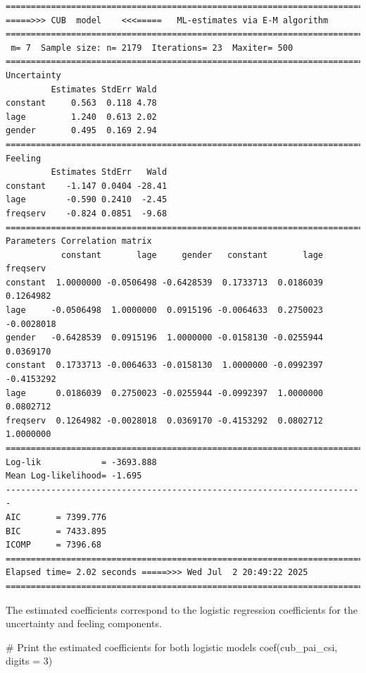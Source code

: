 \documentclass[
  letterpaper,
  DIV=11,
  numbers=noendperiod]{scrartcl}
\newenvironment{Shaded}{\begin{snugshade}}{\end{snugshade}}
\newcommand{\AttributeTok}[1]{\textcolor[rgb]{0.40,0.45,0.13}{#1}}
\newcommand{\CommentTok}[1]{\textcolor[rgb]{0.37,0.37,0.37}{#1}}
\newcommand{\DecValTok}[1]{\textcolor[rgb]{0.68,0.00,0.00}{#1}}
\newcommand{\FunctionTok}[1]{\textcolor[rgb]{0.28,0.35,0.67}{#1}}
\newcommand{\NormalTok}[1]{\textcolor[rgb]{0.00,0.23,0.31}{#1}}
\begin{document}
\begin{verbatim}
======================================================================= 
=====>>> CUB  model    <<<=====   ML-estimates via E-M algorithm   
======================================================================= 
 m= 7  Sample size: n= 2179  Iterations= 23  Maxiter= 500 
======================================================================= 
Uncertainty                                            
         Estimates StdErr Wald
constant     0.563  0.118 4.78
lage         1.240  0.613 2.02
gender       0.495  0.169 2.94
======================================================================= 
Feeling                                            
         Estimates StdErr   Wald
constant    -1.147 0.0404 -28.41
lage        -0.590 0.2410  -2.45
freqserv    -0.824 0.0851  -9.68
======================================================================= 
Parameters Correlation matrix 
           constant       lage     gender   constant       lage   freqserv
constant  1.0000000 -0.0506498 -0.6428539  0.1733713  0.0186039  0.1264982
lage     -0.0506498  1.0000000  0.0915196 -0.0064633  0.2750023 -0.0028018
gender   -0.6428539  0.0915196  1.0000000 -0.0158130 -0.0255944  0.0369170
constant  0.1733713 -0.0064633 -0.0158130  1.0000000 -0.0992397 -0.4153292
lage      0.0186039  0.2750023 -0.0255944 -0.0992397  1.0000000  0.0802712
freqserv  0.1264982 -0.0028018  0.0369170 -0.4153292  0.0802712  1.0000000
======================================================================= 
Log-lik            = -3693.888 
Mean Log-likelihood= -1.695 
----------------------------------------------------------------------- 
AIC       = 7399.776 
BIC       = 7433.895 
ICOMP     = 7396.68 
======================================================================= 
Elapsed time= 2.02 seconds =====>>> Wed Jul  2 20:49:22 2025 
======================================================================= 
\end{verbatim}

The estimated coefficients correspond to the logistic regression
coefficients for the uncertainty and feeling components.

\begin{Shaded}
\begin{Highlighting}[]
\CommentTok{\# Print the estimated coefficients for both logistic models}
\FunctionTok{coef}\NormalTok{(cub\_pai\_csi, }\AttributeTok{digits =} \DecValTok{3}\NormalTok{)}
\end{Highlighting}
\end{Shaded}
\end{document}
